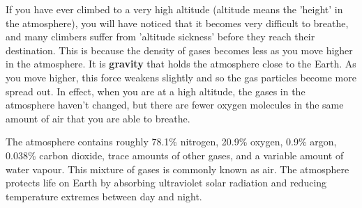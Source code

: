 
If you have ever climbed to a very high altitude (altitude means the 'height' in the atmosphere), you will have noticed that it becomes very difficult to breathe, and many climbers suffer from 'altitude sickness' before they reach their destination. This is because the density of gases becomes less as you move higher in the atmosphere. It is \textbf{gravity} that holds the atmosphere close to the Earth. As you move higher, this force weakens slightly and so the gas particles become more spread out. In effect, when you are at a high altitude, the gases in the atmosphere haven't changed, but there are fewer oxygen molecules in the same amount of air that you are able to breathe.

The atmosphere contains roughly 78.1\% nitrogen, 20.9\% oxygen, 0.9\% argon, 0.038\% carbon dioxide, trace amounts of other gases, and a variable amount of water vapour. This mixture of gases is commonly known as air. The atmosphere protects life on Earth by absorbing ultraviolet solar radiation and reducing temperature extremes between day and night.


